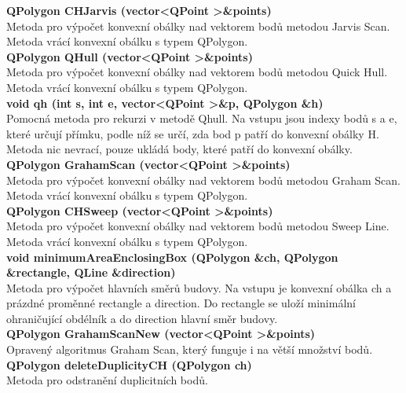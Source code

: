 \documentclass[a4paper, 12pt]{article}
\begin{document}
\textbf{QPolygon CHJarvis (vector\textless QPoint \textgreater \&points)}\\
Metoda pro výpočet konvexní obálky nad vektorem bodů metodou Jarvis Scan. Metoda vrácí konvexní obálku s typem QPolygon.
\\

\textbf{QPolygon QHull (vector\textless QPoint \textgreater \&points)}\\
Metoda pro výpočet konvexní obálky nad vektorem bodů metodou Quick Hull. Metoda vrácí konvexní obálku s typem QPolygon.
\\

\textbf{void qh (int s, int e, vector\textless QPoint \textgreater \&p, QPolygon \&h)}\\
Pomocná metoda pro rekurzi v metodě Qhull. Na vstupu jsou indexy bodů s a e, které určují přímku, podle níž se určí, zda bod p patří do konvexní obálky H. Metoda nic nevrací, pouze ukládá body, které patří do konvexní obálky.
\\

\textbf{QPolygon GrahamScan (vector\textless QPoint \textgreater \&points)}\\
Metoda pro výpočet konvexní obálky nad vektorem bodů metodou Graham Scan. Metoda vrácí konvexní obálku s typem QPolygon.
\\

\textbf{QPolygon CHSweep (vector\textless QPoint \textgreater \&points)}\\
Metoda pro výpočet konvexní obálky nad vektorem bodů metodou Sweep Line. Metoda vrácí konvexní obálku s typem QPolygon.
\\

\textbf{void minimumAreaEnclosingBox (QPolygon \&ch, QPolygon \&rectangle, QLine \&direction)}\\
Metoda pro výpočet hlavních směrů budovy. Na vstupu je konvexní obálka ch a prázdné proměnné rectangle a direction. Do rectangle se uloží minimální ohraničující obdélník a do direction hlavní směr budovy.
\\

\textbf{QPolygon GrahamScanNew (vector\textless QPoint \textgreater \&points)}\\
Opravený algoritmus Graham Scan, který funguje i na větší množství bodů.
\\

\textbf{QPolygon deleteDuplicityCH (QPolygon ch)}\\
Metoda pro odstranění duplicitních bodů.
\\
\end{document}

